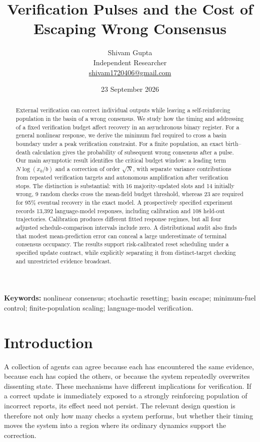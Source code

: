 \documentclass[11pt]{article}
\title{\vspace{-8mm}\bfseries Verification Pulses and the Cost of\protect\\ Escaping Wrong Consensus}
\author{Shivam Gupta\\\small Independent Researcher\\\small\href{mailto:shivam1720406@gmail.com}{shivam1720406@gmail.com}}
\date{23 September 2026}
\theoremstyle{remark}\newtheorem{remark}[theorem]{Remark}
\begin{document}
\maketitle\thispagestyle{plain}
\begin{abstract}
External verification can correct individual outputs while leaving a self-reinforcing population in the basin of a wrong consensus. We study how the timing and addressing of a fixed verification budget affect recovery in an asynchronous binary register. For a general nonlinear response, we derive the minimum fuel required to cross a basin boundary under a peak verification constraint. For a finite population, an exact birth--death calculation gives the probability of subsequent wrong consensus after a pulse. Our main asymptotic result identifies the critical budget window: a leading term $N\log(x_0/b)$ and a correction of order $\sqrt N$, with separate variance contributions from repeated verification targets and autonomous amplification after verification stops. The distinction is substantial: with 16 majority-updated slots and 14 initially wrong, 9 random checks cross the mean-field budget threshold, whereas 23 are required for 95\% eventual recovery in the exact model. A prospectively specified experiment records 13,392 language-model responses, including calibration and 108 held-out trajectories. Calibration produces different fitted response regimes, but all four adjusted schedule-comparison intervals include zero. A distributional audit also finds that modest mean-prediction error can conceal a large underestimate of terminal consensus occupancy. The results support risk-calibrated reset scheduling under a specified update contract, while explicitly separating it from distinct-target checking and unrestricted evidence broadcast.
\end{abstract}
\noindent\textbf{Keywords:} nonlinear consensus; stochastic resetting; basin escape; minimum-fuel control; finite-population scaling; language-model verification.

\section{Introduction}
A collection of agents can agree because each has encountered the same evidence, because each has copied the others, or because the system repeatedly overwrites dissenting state. These mechanisms have different implications for verification. If a correct update is immediately exposed to a strongly reinforcing population of incorrect reports, its effect need not persist. The relevant design question is therefore not only how many checks a system performs, but whether their timing moves the system into a region where its ordinary dynamics support the correction.
\end{document}
